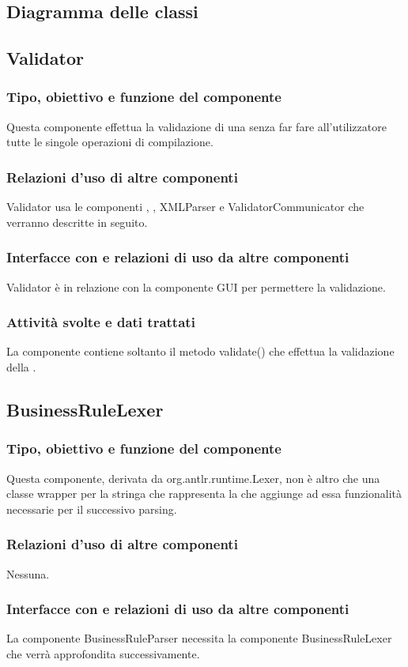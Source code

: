 \documentclass[11pt,titlepage,a4paper]{report}
\begin{document}
\subsection{Diagramma delle classi}
\subsection{Validator}%
\subsubsection{Tipo, obiettivo e funzione del componente}
Questa componente effettua la validazione di una \br senza far fare all'utilizzatore tutte le singole operazioni di compilazione.
\subsubsection{Relazioni d'uso di altre componenti}
Validator usa le componenti \brp, \brl, XMLParser e ValidatorCommunicator che verranno descritte in seguito.
\subsubsection{Interfacce con e relazioni di uso da altre componenti}
Validator \`e in relazione con la componente GUI per permettere la validazione.
\subsubsection{Attivit\`a svolte e dati trattati}
La componente contiene soltanto il metodo validate() che effettua la validazione della \br.

\subsection{BusinessRuleLexer}
\subsubsection{Tipo, obiettivo e funzione del componente}
Questa componente, derivata da org.antlr.runtime.Lexer, non \`e altro che una classe wrapper per la stringa che rappresenta la \br che aggiunge ad essa funzionalit\`a necessarie per il successivo parsing.
\subsubsection{Relazioni d'uso di altre componenti}
Nessuna.
\subsubsection{Interfacce con e relazioni di uso da altre componenti}
La componente BusinessRuleParser necessita la componente BusinessRuleLexer che verr\`a approfondita successivamente.
\end{document}
